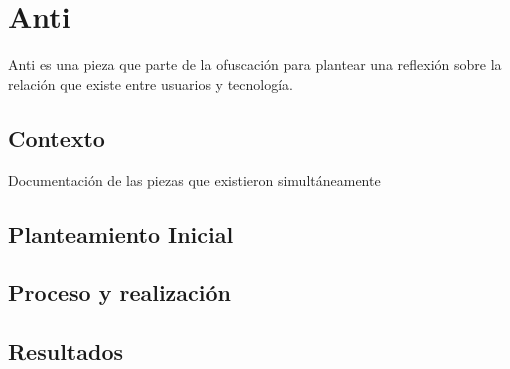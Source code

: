 \section{Anti}


Anti es una pieza que parte de la ofuscación para plantear una reflexión sobre la relación que existe entre usuarios y tecnología.

\subsection{Contexto}

Documentación de las piezas que existieron simultáneamente 

\subsection{Planteamiento Inicial}
\subsection{Proceso y realización}
\subsection{Resultados}

